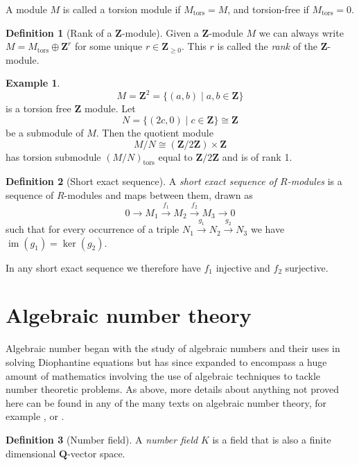 \documentclass[12pt,a4paper,abstracton,bibtotoc]{scrreprt}
\theoremstyle{definition}
\newtheorem{defn}{Definition}
\newtheorem{ex}{Example}
\newcommand{\QQ}{\mathbf{Q}}
\newcommand{\ZZ}{\mathbf{Z}}
\DeclareMathOperator{\im}{im}
\begin{document}
A module $M$ is called a torsion module if $M_\text{tors} = M$, and torsion-free if $M_\text{tors} = 0$.


\begin{defn}[Rank of a $\ZZ$-module]
Given a $\ZZ$-module $M$ we can always write $M = M_\text{tors} \oplus \ZZ^r$ for some unique $r\in \ZZ_{\ge 0}$.
This $r$ is called the \emph{rank} of the $\ZZ$-module.
\end{defn}

\begin{ex}
\[M = \ZZ^2 = \{(a,b)\mid a,b\in \ZZ\}\]
is a torsion free $\ZZ$ module. Let
\[N = \{(2c,0) \mid c\in\ZZ\} \cong \ZZ\]
be a submodule of $M$.
Then the quotient module
\[M/N \cong (\ZZ/2\ZZ)\times \ZZ\]
has torsion submodule $(M/N)_\text{tors}$ equal to $\ZZ/2\ZZ$ and is of rank 1.
\end{ex}

\begin{defn}[Short exact sequence]
A \emph{short exact sequence of $R$-modules} is a sequence of $R$-modules and maps between them, drawn as
\[
0 \to M_1 \xrightarrow{f_1} M_2 \xrightarrow{f_2} M_3 \to 0
\]
such that for every occurrence of a triple $N_1 \xrightarrow{g_1} N_2 \xrightarrow{g_2} N_3$ we have $\im(g_1) = \ker(g_2)$.
\end{defn}

In any short exact sequence we therefore have $f_1$ injective and $f_2$ surjective.


\section{Algebraic number theory}
\label{sec:ant}

Algebraic number began with the study of algebraic numbers and their uses in solving Diophantine equations but has since expanded to encompass a huge amount of mathematics involving the use of algebraic techniques to tackle number theoretic problems. %
As above, more details about anything not proved here can be found in any of the many texts on algebraic number theory, for example \cite{neukirch}, \cite{lang} or \cite{narkiewicz}.

\begin{defn}[Number field]
A \emph{number field} $K$ is a field that is also a finite dimensional $\QQ$-vector space.
\end{defn}
\end{document}
